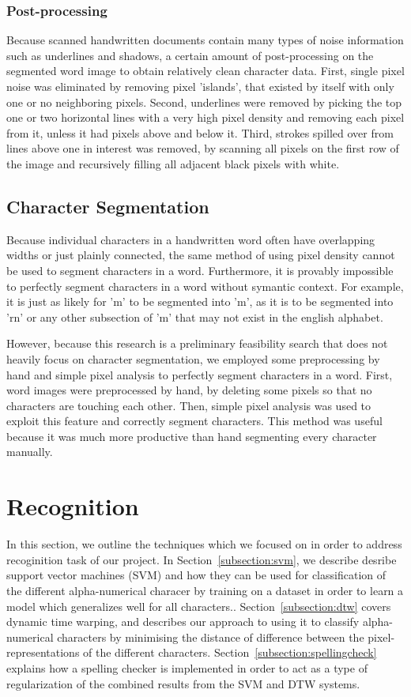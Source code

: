 \documentclass[12pt]{article}
\begin{document}
		\subsubsection{Post-processing}
		Because scanned handwritten documents contain many types of noise information such as underlines and shadows, a certain amount of post-processing on the segmented word image to obtain relatively clean character data. First, single pixel noise was eliminated by removing pixel 'islands', that existed by itself with only one or no neighboring pixels. Second, underlines were removed by picking the top one or two horizontal lines with a very high pixel density and removing each pixel from it, unless it had pixels above and below it. Third, strokes spilled over from lines above one in interest was removed, by scanning all pixels on the first row of the image and recursively filling all adjacent black pixels with white.
		

	\subsection{Character Segmentation}
		Because individual characters in a handwritten word often have overlapping widths or just plainly connected, the same method of using pixel density cannot be used to segment characters in a word. Furthermore, it is provably impossible to perfectly segment characters in a word without symantic context. For example, it is just as likely for 'm' to be segmented into 'm', as it is to be segmented into 'rn' or any other subsection of 'm' that may not exist in the english alphabet.
		
		However, because this research is a preliminary feasibility search that does not heavily focus on character segmentation, we employed some preprocessing by hand and simple pixel analysis to perfectly segment characters in a word. First, word images were preprocessed by hand, by deleting some pixels so that no characters are touching each other. Then, simple pixel analysis was used to exploit this feature and correctly segment characters. This method was useful because it was much more productive than hand segmenting every character manually.

			
\section{Recognition}
\label{section:recognition}
	In this section, we outline the techniques which we focused on in order to address recoginition task of our project. In Section~\ref{subsection:svm}, we describe desribe support vector machines (SVM) and how they can be used for classification of the different alpha-numerical characer by training on a dataset in order to learn a model which generalizes well for all characters.. Section~\ref{subsection:dtw} covers dynamic time warping, and describes our approach to using it to classify alpha-numerical characters by minimising the distance of difference between the pixel-representations of the different characters. Section~\ref{subsection:spellingcheck} explains how a spelling checker is implemented in order to act as a type of regularization of the combined results from the SVM and DTW systems.
\end{document}
